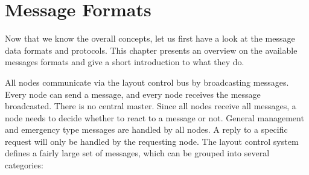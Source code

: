 \chapter{Message Formats}

Now that we know the overall concepts, let us first have a look at the message data formats and protocols. This chapter presents an overview on the available messages formats and give a short introduction to what they do. 

\begin{center}
\end{center}

All nodes communicate via the layout control bus by broadcasting messages. Every node can send a message, and every node receives the message broadcasted. There is no central master. Since all nodes receive all messages, a node needs to decide whether to react to a message or not. General management and emergency type messages are handled by all nodes. A reply to a specific request will only be handled by the requesting node. The layout control system defines a fairly large set of messages, which can be grouped into several categories:

